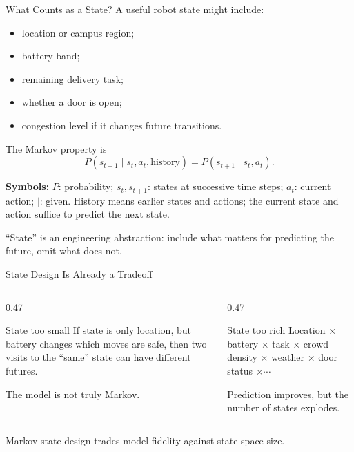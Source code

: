 \documentclass[aspectratio=169,10pt]{beamer}
\newcommand{\equationlegend}[1]{%
  \par\smallskip
  \begingroup
    \setlength{\fboxsep}{4pt}%
    \noindent\colorbox{DeckSoft}{%
      \parbox{\dimexpr\linewidth-2\fboxsep\relax}{%
        \footnotesize\textbf{Symbols:} #1%
      }%
    }\par
  \endgroup
  \smallskip
}
\begin{document}
\begin{frame}[shrink=10]{What Counts as a State?}
  A useful robot state might include:
  \begin{itemize}
    \item location or campus region;
    \item battery band;
    \item remaining delivery task;
    \item whether a door is open;
    \item congestion level if it changes future transitions.
  \end{itemize}

  The Markov property is
  \[
    P(s_{t+1}\mid s_t,a_t,\text{history})
    =P(s_{t+1}\mid s_t,a_t).
  \]
  \equationlegend{$P$: probability; $s_t,s_{t+1}$: states at successive time steps; $a_t$: current action; $\mid$: given. History means earlier states and actions; the current state and action suffice to predict the next state.}

  \begin{keyidea}
    ``State'' is an engineering abstraction: include what matters for predicting the future, omit what does not.
  \end{keyidea}
\end{frame}

\begin{frame}[shrink=10]{State Design Is Already a Tradeoff}
  \begin{columns}[T,onlytextwidth]
    \begin{column}{0.47\textwidth}
      \begin{block}{State too small}
        If state is only location, but battery changes which moves are safe, then two visits to the ``same'' state can have different futures.

        The model is not truly Markov.
      \end{block}
    \end{column}
    \begin{column}{0.47\textwidth}
      \begin{block}{State too rich}
        Location $\times$ battery $\times$ task $\times$ crowd density $\times$ weather $\times$ door status $\times \cdots$

        Prediction improves, but the number of states explodes.
      \end{block}
    \end{column}
  \end{columns}

  \begin{keyidea}
    Markov state design trades model fidelity against state-space size.
  \end{keyidea}
\end{frame}
\end{document}

